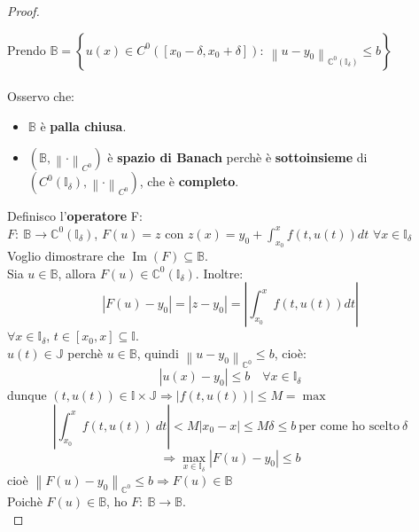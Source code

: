 \documentclass[a4paper, oneside]{article}
\newcommand\norma{\left\lVert\cdot\right\rVert}
\newcommand\C{\mathbb{C}}
\newcommand\B{\mathbb{B}}
\newcommand\I{\mathbb{I}}
\newcommand\J{\mathbb{J}}
\begin{document}
\begin{theorem}
\begin{proof}
\begin{center}
        \end{center}
        \noindent
        Prendo $\B = \left\{u(x)\in C^0 \left([x_0-\delta,x_0+\delta]\right): \ \left\lVert u-y_0\right\rVert_{\C^0(\I_\delta)} \leq b \right\}$\\\\
        Osservo che:
        \begin{itemize}
            \item $\B$ è \textbf{palla chiusa}.
            \item $(\B,\norma_{C^0})$ è \textbf{spazio di Banach} perchè è \textbf{sottoinsieme} di $\left(C^0(\I_\delta),\norma_{C^0}\right)$, che è \textbf{completo}. 
        \end{itemize}

        \noindent Definisco l'\textbf{operatore} F:\\
        $F: \ \B\to\C^0(\I_\delta)$, $F(u) = z$ con $z(x) = y_0 + \int_{x_0}^{x} f\left(t,u(t)\right) dt$ $\forall x\in\I_\delta$\\

        \noindent Voglio dimostrare che $\operatorname{Im}(F)\subseteq\B$.\\

        \noindent Sia $u\in\B$, allora $F(u)\in\C^0(\I_\delta)$. Inoltre:\\
        \[\left|F(u) - y_0\right| = \left|z-y_0\right| = \left|\int_{x_0}^{x} f\left(t,u(t)\right) dt\right|\]
        $\forall x\in\I_\delta$, $t\in[x_0,x]\subseteq\I$.\\
        $u(t)\in\J$ perchè $u\in\B$, quindi $\left\lVert u-y_0\right\rVert_{\C^0} \leq b$, cioè:
        \[\left|u(x) - y_0\right| \leq b \quad\forall x\in\I_\delta\]
        dunque $\left(t,u(t)\right)\in\I\times\J \Rightarrow \left|f\left(t,u(t)\right)\right|\leq M = \max$
        \[\left|\int_{x_0}^{x} f\left(t,u(t)\right) \ dt\right| < M \left|x_0-x\right| \leq M \delta \leq b \ \text{per come ho scelto} \ \delta\]
        \[\Rightarrow\max_{x\in\I_\delta} \left|F(u) - y_0\right| \leq b\]
        cioè $\left\lVert F(u) - y_0\right\rVert_{\C^0} \leq b \Rightarrow F(u)\in\B$\\

        \noindent Poichè $F(u)\in\B$, ho $F: \ \B\to\B$.\\


\end{proof}
\end{theorem}
\end{document}
